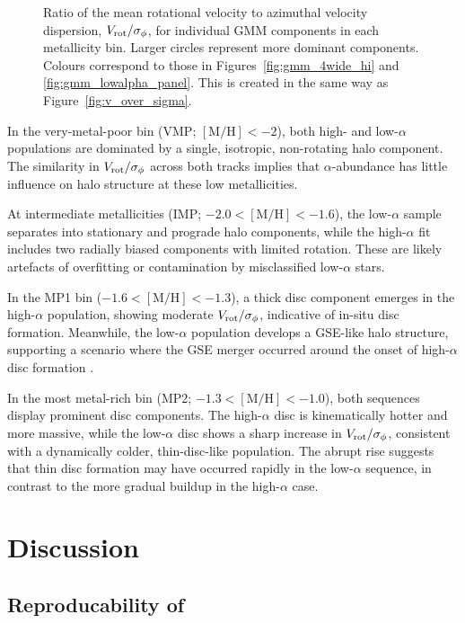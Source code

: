 \documentclass[a4paper,12pt]{article}
\begin{document}
\begin{figure}[H]
  \caption{Ratio of the mean rotational velocity to azimuthal velocity dispersion, $V_{\rm rot}/\sigma_\phi$, for individual GMM components in each metallicity bin. Larger circles represent more dominant components. Colours correspond to those in Figures~\ref{fig:gmm_4wide_hi} and \ref{fig:gmm_lowalpha_panel}. This is created in the same way as Figure~\ref{fig:v_over_sigma}.}
  \label{fig:v_over_sigma_alpha}
\end{figure}

In the very-metal-poor bin (VMP; $[\mathrm{M/H}] < -2$), both high- and low-$\alpha$ populations are dominated by a single, isotropic, non-rotating halo component. The similarity in $V_{\rm rot}/\sigma_\phi$ across both tracks implies that $\alpha$-abundance has little influence on halo structure at these low metallicities.

At intermediate metallicities (IMP; $-2.0 < [\mathrm{M/H}] < -1.6$), the low-$\alpha$ sample separates into stationary and prograde halo components, while the high-$\alpha$ fit includes two radially biased components with limited rotation. These are likely artefacts of overfitting or contamination by misclassified low-$\alpha$ stars.

In the MP1 bin ($-1.6 < [\mathrm{M/H}] < -1.3$), a thick disc component emerges in the high-$\alpha$ population, showing moderate $V_{\rm rot}/\sigma_\phi$, indicative of in-situ disc formation. Meanwhile, the low-$\alpha$ population develops a GSE-like halo structure, supporting a scenario where the GSE merger occurred around the onset of high-$\alpha$ disc formation \citep{Helmi2018}.

In the most metal-rich bin (MP2; $-1.3 < [\mathrm{M/H}] < -1.0$), both sequences display prominent disc components. The high-$\alpha$ disc is kinematically hotter and more massive, while the low-$\alpha$ disc shows a sharp increase in $V_{\rm rot}/\sigma_\phi$, consistent with a dynamically colder, thin-disc-like population. The abrupt rise suggests that thin disc formation may have occurred rapidly in the low-$\alpha$ sequence, in contrast to the more gradual buildup in the high-$\alpha$ case.


\section{Discussion} \label{sec:discussion}

\subsection{\texorpdfstring{Reproducability of \citet{zhang2024existencemetalpoordiscmilky}}{Reproducability of Zhang et al.\ (2024)}}
\end{document}
